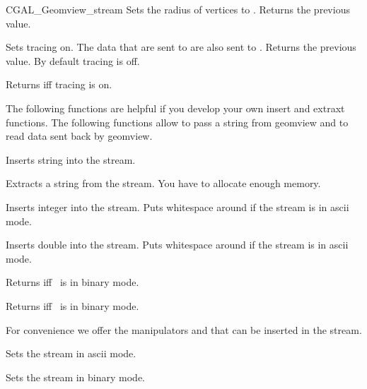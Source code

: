 \begin{ccClass}{CGAL_Geomview_stream}
{Sets the radius of vertices to . Returns the previous value.}

{Sets tracing on. The data that are sent to  are also
 sent to .  Returns the previous value. By default tracing is
 off.}

{Returns  iff tracing is on.}



The following functions are helpful if you develop your own insert
and extraxt functions. The following functions allow to pass a string
from geomview and to read data sent back by geomview.

{Inserts string  into the stream.}


{Extracts a string  from the stream.
\ccPrecond You have to allocate enough memory.}

{Inserts integer  into the stream. Puts whitespace around if the
stream is in ascii mode.}


{Inserts double  into the stream. Puts whitespace around if the
stream is in ascii mode.}

{Returns  iff \ccVar\ is in binary mode.}

{Returns  iff \ccVar\ is in binary mode.}


For convenience we offer the manipulators  and 
that can be inserted in the stream.

{Sets the stream in ascii mode.}

{Sets the stream in binary mode.}



\begin{cprog}

\end{cprog} 


\end{ccClass}
